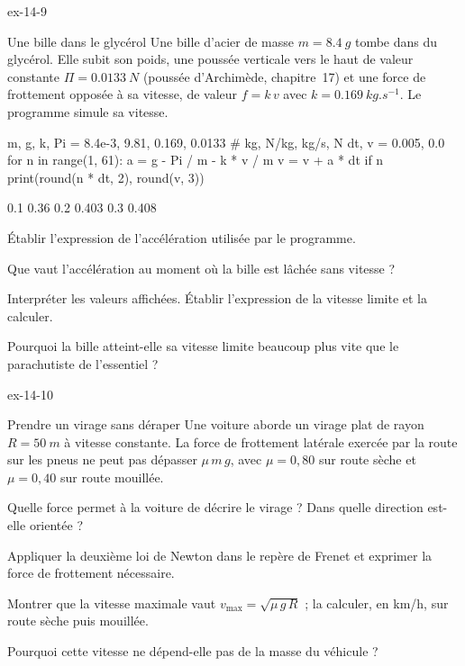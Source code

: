 \begin{blocLivre}{ex-14-9}
\begin{exercice}[2]{Une bille dans le glycérol}
Une bille d'acier de masse $m=\qty{8,4}{g}$ tombe dans du glycérol. Elle subit son poids, une poussée verticale vers le
haut de valeur constante $\Pi=\qty{0,0133}{N}$ (poussée d'Archimède, chapitre~17) et une force de frottement opposée à
sa vitesse, de valeur $f=k\,v$ avec $k=\qty{0,169}{kg.s^{-1}}$. Le programme simule sa vitesse.
\begin{python}
m, g, k, Pi = 8.4e-3, 9.81, 0.169, 0.0133      # kg, N/kg, kg/s, N
dt, v = 0.005, 0.0
for n in range(1, 61):
    a = g - Pi / m - k * v / m
    v = v + a * dt
    if n %
        print(round(n * dt, 2), round(v, 3))
\end{python}
\begin{console}
0.1 0.36
0.2 0.403
0.3 0.408
\end{console}
\begin{questions}
\item {}Établir l'expression de l'accélération utilisée par le programme.
\item Que vaut l'accélération au moment où la bille est lâchée sans vitesse ?
\item Interpréter les valeurs affichées. Établir l'expression de la vitesse limite et la calculer.
\item Pourquoi la bille atteint-elle sa vitesse limite beaucoup plus vite que le parachutiste de l'essentiel ?
\end{questions}
\end{exercice}
\end{blocLivre}
\begin{blocLivre}{ex-14-10}
\begin{exercice}[2]{Prendre un virage sans déraper}
Une voiture aborde un virage plat de rayon $R=\qty{50}{m}$ à vitesse constante. La force de frottement latérale exercée
par la route sur les pneus ne peut pas dépasser $\mu\,m\,g$, avec $\mu=0{,}80$ sur route sèche et $\mu=0{,}40$ sur route
mouillée.
\begin{questions}
\item Quelle force permet à la voiture de décrire le virage ? Dans quelle direction est-elle orientée ?
\item Appliquer la deuxième loi de Newton dans le repère de Frenet et exprimer la force de frottement nécessaire.
\item Montrer que la vitesse maximale vaut $v_{\max}=\sqrt{\mu\,g\,R}$ ; la calculer, en km/h, sur route sèche puis
mouillée.
\item Pourquoi cette vitesse ne dépend-elle pas de la masse du véhicule ?
\end{questions}
\end{exercice}
\end{blocLivre}
